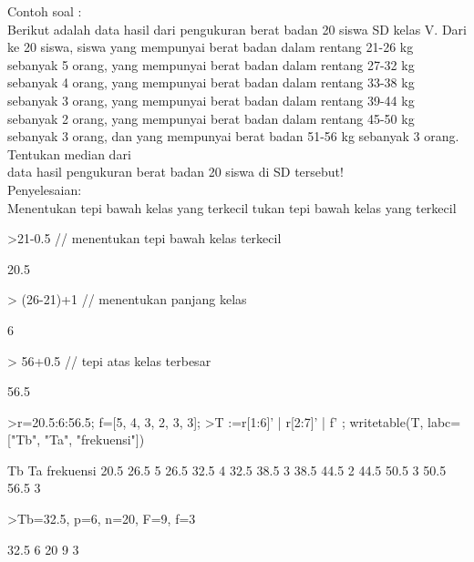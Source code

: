 \documentclass[a4paper,10pt]{article}
\begin{document}
\begin{eulernotebook}
\begin{eulercomment}
\begin{eulercomment}
\begin{eulercomment}
\begin{eulercomment}
\begin{eulercomment}
\begin{eulercomment}
\begin{eulercomment}
\begin{eulercomment}
\begin{eulercomment}
\begin{eulercomment}
\begin{eulercomment}
Contoh soal :\\
Berikut adalah data hasil dari pengukuran berat badan 20 siswa SD
kelas V. Dari ke 20 siswa, siswa yang mempunyai berat badan dalam
rentang 21-26 kg sebanyak 5 orang, yang mempunyai berat badan dalam
rentang 27-32 kg sebanyak 4 orang, yang mempunyai berat badan dalam
rentang 33-38 kg sebanyak 3 orang, yang mempunyai berat badan dalam
rentang 39-44 kg sebanyak 2 orang, yang mempunyai berat badan dalam
rentang 45-50 kg sebanyak 3 orang, dan yang mempunyai berat badan
51-56 kg sebanyak 3 orang. Tentukan median dari\\
data hasil pengukuran berat badan 20 siswa di SD tersebut!\\
Penyelesaian:\\
Menentukan tepi bawah kelas yang terkecil tukan tepi bawah kelas yang
terkecil
\end{eulercomment}
\begin{eulerprompt}
>21-0.5 // menentukan tepi bawah kelas terkecil
\end{eulerprompt}
\begin{euleroutput}
  20.5
\end{euleroutput}
\begin{eulerprompt}
> (26-21)+1 // menentukan panjang kelas
\end{eulerprompt}
\begin{euleroutput}
  6
\end{euleroutput}
\begin{eulerprompt}
> 56+0.5 // tepi atas kelas terbesar
\end{eulerprompt}
\begin{euleroutput}
  56.5
\end{euleroutput}
\begin{eulerprompt}
>r=20.5:6:56.5; f=[5, 4, 3, 2, 3, 3];
>T :=r[1:6]' | r[2:7]' | f' ; writetable(T, labc=["Tb", "Ta", "frekuensi"])
\end{eulerprompt}
\begin{euleroutput}
          Tb        Ta frekuensi
        20.5      26.5         5
        26.5      32.5         4
        32.5      38.5         3
        38.5      44.5         2
        44.5      50.5         3
        50.5      56.5         3
\end{euleroutput}
\begin{eulerprompt}
>Tb=32.5, p=6, n=20, F=9, f=3
\end{eulerprompt}
\begin{euleroutput}
  32.5
  6
  20
  9
  3
\end{euleroutput}

\end{eulercomment}
\end{eulercomment}
\end{eulercomment}
\end{eulercomment}
\end{eulercomment}
\end{eulercomment}
\end{eulercomment}
\end{eulercomment}
\end{eulercomment}
\end{eulercomment}
\end{eulernotebook}
\end{document}
